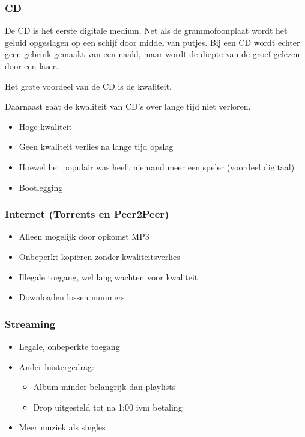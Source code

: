 \subsubsection*{CD}
De CD is het eerste digitale medium. Net als de grammofoonplaat wordt het geluid opgeslagen op een schijf door middel van putjes. Bij een CD wordt echter geen gebruik gemaakt van een naald, maar wordt de diepte van de groef gelezen door een laser.

Het grote voordeel van de CD is de kwaliteit.

Daarnaast gaat de kwaliteit van CD's over lange tijd niet verloren.


\begin{itemize}
    \item Hoge kwaliteit
    \item Geen kwaliteit verlies na lange tijd opslag
    \item Hoewel het populair was heeft niemand meer een speler (voordeel digitaal)
    \item Bootlegging
\end{itemize}

\subsubsection*{Internet (Torrents en Peer2Peer)}


\begin{itemize}
    \item Alleen mogelijk door opkomst MP3
    \item Onbeperkt kopiëren zonder kwaliteitsverlies
    \item Illegale toegang, wel lang wachten voor kwaliteit
    \item Downloaden lossen nummers
\end{itemize}

\subsubsection*{Streaming}


\begin{itemize}
    \item Legale, onbeperkte toegang
    \item Ander luistergedrag: \begin{itemize}
        \item Album minder belangrijk dan playlists
        \item Drop uitgesteld tot na 1:00 ivm betaling
    \end{itemize}
    \item Meer muziek als singles
\end{itemize}

